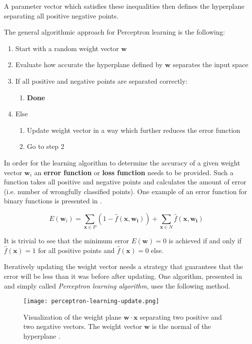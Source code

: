 A parameter vector which satisfies these inequalities then defines the hyperplane separating all positive negative points.

The general algorithmic approach for Perceptron learning is the following:
\begin{enumerate}
    \item Start with a random weight vector $\bm{w}$
    \item Evaluate how accurate the hyperplane defined by $\bm{w}$ separates the input space
    \item If all positive and negative points are separated correctly:
    \begin{enumerate}
        \item \textbf{Done}
    \end{enumerate}
    \item Else
    \begin{enumerate}
        \item Update weight vector in a way which further reduces the error function
        \item Go to step 2
    \end{enumerate}
\end{enumerate}

In order for the learning algorithm to determine the accuracy of a given weight vector $\bm{w}_i$ an \textbf{error function} or \textbf{loss function} needs to be provided.
Such a function takes all positive and negative points and calculates the amount of error (i.e. number of wrongfully classified points).
One example of an error function for binary functions is presented in \cite{rojas_neural_1996}.

\begin{equation}
    \label{eq:error-binary}
    E(\bm{w}_i) = \sum_{\bm{x} \in P} (1 - \hat{f}(\bm{x},\bm{w_i})) + \sum_{\bm{x} \in N} \hat{f}(\bm{x},\bm{w_i})
\end{equation}

It is trivial to see that the minimum error $E(\bm{w}) = 0$ is achieved if and only if $\hat{f}(\bm{x}) = 1$ for all positive points and $\hat{f}(\bm{x}) = 0$ else.

Iteratively updating the weight vector needs a strategy that guarantees that the error will be less than it was before after updating.
One algorithm, presented in \cite{rojas_neural_1996} and simply called \textit{Perceptron learning algorithm}, uses the following method.

\begin{figure}[htb!]
    \centering
    \texttt{[image: perceptron-learning-update.png]}
    \caption{Visualization of the weight plane $\bm{w} \cdot \bm{x}$ separating two positive and two negative vectors. The weight vector $\bm{w}$ is the normal of the hyperplane \cite{rojas_neural_1996}.}
    \label{fig:perceptron-learning-update}
\end{figure}

